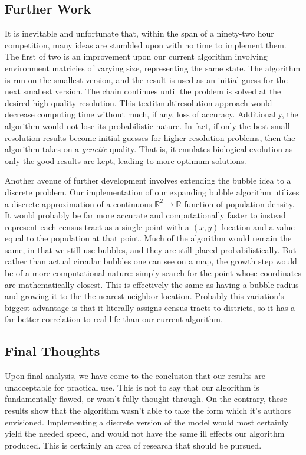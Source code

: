 \documentclass[11pt]{article}				%
\begin{document}
	\subsection{Further Work}

It is inevitable and unfortunate that, within the span of a ninety-two
hour competition, many ideas are stumbled upon with no time to implement
them. The first of two is an improvement upon our current algorithm
involving environment matricies of varying size, representing the same
state. The algorithm is run on the smallest version, and the result is
used as an initial guess for the next smallest version. The chain
continues until the problem is solved at the desired high quality
resolution. This textit{multiresolution} approach would decrease
computing time without much, if any, loss of accuracy. Additionally, the
algorithm would not lose its probabilistic nature. In fact, if only the
best small resolution results become initial guesses for higher
resolution problems, then the algorithm takes on a \textit{genetic}
quality. That is, it emulates biological evolution as only the good
results are kept, leading to more optimum solutions.

Another avenue of further development involves extending the bubble idea
to a discrete problem. Our implementation of our expanding bubble
algorithm utilizes a discrete approximation of a continuous $\mathbb{R}^2 
\longrightarrow \mathbb{R}$ function of population density. It would
probably be far more accurate and computationally faster to instead
represent each census tract as a single point with a $(x,y)$ location and 
a value equal to the population at that point. Much of the algorithm
would remain the same, in that we still use bubbles, and they are still
placed probabilistically. But rather than actual circular bubbles one can 
see on a map, the growth step would be of a more computational nature:
simply search for the point whose coordinates are mathematically closest. 
This is effectively the same as having a bubble radius and growing it to
the the nearest neighbor location. Probably this variation's biggest
advantage is that it literally assigns census tracts to districts, so it
has a far better correlation to real life than our current algorithm.

	\subsection{Final Thoughts}
Upon final analysis, we have come to the conclusion that our results are unacceptable for practical use.  This is not to say that our algorithm is fundamentally flawed, or wasn't fully thought through.  On the contrary, these results show that the algorithm wasn't able to take the form which it's authors envisioned.  Implementing a discrete version of the model would most certainly yield the needed speed, and would not have the same ill effects our algorithm produced.  This is certainly an area of research that should be pursued.
\end{document}
